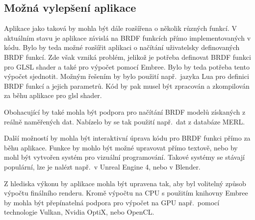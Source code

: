 \documentclass[czech,master]{diploma}
\begin{document}
\subsection*{Možná vylepšení aplikace}
Aplikace jako taková by mohla být dále rozšířena o několik různých funkcí. V aktuálním stavu je aplikace závislá na BRDF funkcích přímo implementovaných v kódu. Bylo by teda možné rozšířit aplikaci o načítání uživatelsky definovaných BRDF funkcí. Zde však vzniká problém, jelikož je potřeba definovat BRDF funkci pro GLSL shader a také pro výpočet pomocí Embree. Bylo by teda potřeba tento výpočet sjednotit. Možným řešením by bylo použití např.\ jazyka Lua pro definici BRDF funkcí a jejich parametrů. Kód by pak musel být zpracován a zkompilován za běhu aplikace pro glsl shader.\par
Obohacující by také mohla být podpora pro načítání BRDF modelů získaných z reálně naměřených dat. Nabízelo by se tak použití např.\ dat z databáze MERL.\par
Další možností by mohla být interaktivní úprava kódu pro BRDF funkci přímo za běhu aplikace. Funkce by mohlo být možné upravovat přímo textově, nebo by mohl být vytvořen systém pro vizuální programování. Takové systémy se stávají populární, lze je nalézt např.\ v Unreal Engine 4, nebo v Blender.\par
Z hlediska výkonu by aplikace mohla být upravena tak, aby byl volitelný způsob výpočtu finálního renderu. Kromě výpočtu na CPU s použitím knihovny Embree by mohla být přepínatelná podpora pro výpočet na GPU např.\ pomocí technologie Vulkan, Nvidia OptiX, nebo OpenCL.

\printbibliography[title={Literatura}, heading=bibintoc]

\end{document}
